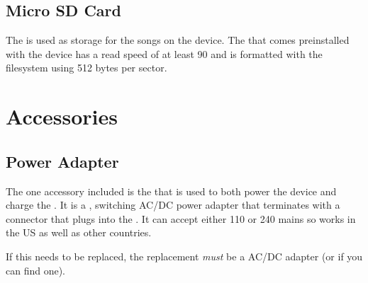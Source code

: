 \section{Micro SD Card} \label{Micro SD Card}

The  is used as storage for the songs on the device.  The  that
comes preinstalled with the device has a read speed of at least
\num{90}  and is formatted with the  filesystem using
\num{512} bytes per sector.

\chapter{Accessories} \label{Accessories}

\section{Power Adapter} \label{Power Adapter}

The one accessory included is the  that is used to both power the device
and charge the \hyperref[Rechargeable Battery]{}.  It is a
,  switching AC/DC power adapter
that terminates with a  connector that plugs into the
\hyperref[Power Port]{}.  It can accept either \num{110} or \num{240}
 mains so works in the US as well as other countries.

\par\medskip

If this needs to be replaced, the replacement \textit{must} be a
 AC/DC adapter (or  if you can find
one).



